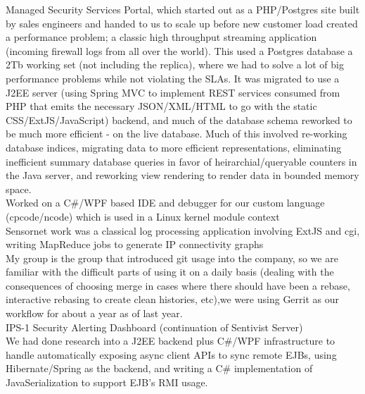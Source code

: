 \documentclass[margin]{res}
\begin{document}
\begin{resume}
Managed Security Services Portal, which started out as a PHP/Postgres
site built by sales engineers and handed to us to scale up before
new customer load created a performance problem; a classic high throughput
streaming application (incoming firewall logs from all over the world).
This used a Postgres database a 2Tb working set (not including the replica),
where we had to solve a lot of big performance problems while not violating the SLAs.  It was migrated to use a J2EE server (using Spring MVC to implement REST services consumed from PHP that emits the necessary JSON/XML/HTML to go with the static CSS/ExtJS/JavaScript) backend, and much of the database schema reworked to be much more efficient - on the live database.  Much of this involved re-working database indices, migrating data to more efficient representations, eliminating inefficient summary database queries in favor of heirarchial/queryable counters in the Java server, and reworking view rendering to render data in bounded memory space. \\

Worked on a C\#/WPF based IDE and debugger for our custom language (cpcode/ncode) which is used in a Linux kernel module context \\
 
Sensornet work was a classical log processing application involving ExtJS and cgi, writing MapReduce jobs to generate IP connectivity graphs \\

My group is the group that introduced git usage into the company,
so we are familiar with the difficult parts of using it on a daily basis
(dealing with the consequences of choosing merge in cases where there
should have been a rebase, interactive rebasing to create clean histories, etc),we were using Gerrit as our workflow for about a year as of last year. \\

IPS-1 Security Alerting Dashboard (continuation of Sentivist Server) \\
We had done research into a J2EE backend plus C\#/WPF infrastructure
to handle automatically exposing async client APIs to sync remote EJBs,
using Hibernate/Spring as the backend, and writing a C\# implementation
of JavaSerialization to support EJB's RMI usage.


\end{resume}
\end{document}
